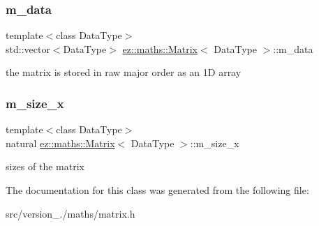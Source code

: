 \subsubsection{\texorpdfstring{m\+\_\+data}{m\_data}}
{\footnotesize\ttfamily template$<$class Data\+Type$>$ \\
std\+::vector$<$Data\+Type$>$ \hyperlink{classez_1_1maths_1_1Matrix}{ez\+::maths\+::\+Matrix}$<$ Data\+Type $>$\+::m\+\_\+data}

the matrix is stored in raw major order as an 1D array \mbox{\label{classez_1_1maths_1_1Matrix_a57afd79b657d3ca032728559e0674000}} 
\subsubsection{\texorpdfstring{m\+\_\+size\+\_\+x}{m\_size\_x}}
{\footnotesize\ttfamily template$<$class Data\+Type$>$ \\
natural \hyperlink{classez_1_1maths_1_1Matrix}{ez\+::maths\+::\+Matrix}$<$ Data\+Type $>$\+::m\+\_\+size\+\_\+x}

sizes of the matrix 

The documentation for this class was generated from the following file\+:\begin{DoxyCompactItemize}
\item 
src/version\+\_./maths/matrix.\+h\end{DoxyCompactItemize}
